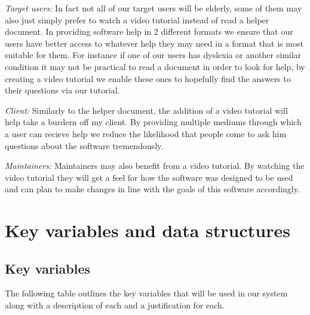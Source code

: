 \textit{Target users:}
In fact not all of our target users will be elderly, some of
them may also just simply prefer to watch a video tutorial instead
of read a helper document. In providing software help in 2 different
formats we ensure that our users have better access to whatever
help they may need in a format that is most suitable for them. For
instance if one of our users has dyslexia or another similar condition
it may not be practical to read a document in order to look for help,
by creating a video tutorial we enable these ones to hopefully find
the answers to their questions via our tutorial.
\\ \vspace{0.2cm}

\textit{Client:}
Similarly to the helper document, the addition of a video tutorial
will help take a burdern off my client. By providing multiple mediums
through which a user can recieve help we reduce the likelihood that
people come to ask him questions about the software tremendously.
\\ \vspace{0.2cm}

\textit{Maintainers:}
Maintainers may also benefit from a video tutorial. By watching the
video tutorial they will get a feel for how the software was designed
to be used and can plan to make changes in line with the goals of this
software accordingly.
\\ \vspace{0.2cm}

\section{Key variables and data structures}

\subsection{Key variables}

The following table outlines the key variables that will
be used in our system along with a description of each and a
justification for each.


